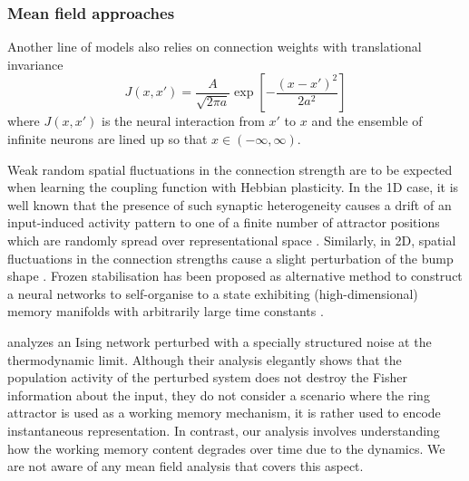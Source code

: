 \documentclass{article} %
\newcounter{ct}
\theoremstyle{definition}
\theoremstyle{remark}
\begin{document}
\subsubsection{Mean field approaches}
Another line of models	\citep{miller2006analysis,wu2008dynamics,fung2010} also relies on connection weights with translational invariance
\begin{equation}
J(x, x') = \frac{A}{\sqrt{2\pi a}} \exp\left[ -\frac{(x - x')^2}{2a^2} \right]
\end{equation}
where \(J (x, x')\) is the neural interaction from \(x'\) to \(x\) and the ensemble of infinite neurons are lined up so that \(x\in (-\infty, \infty)\).

Weak random spatial fluctuations in the connection strength are to be expected when learning the coupling function with Hebbian plasticity.
In the 1D case, it is well known that the presence of such synaptic heterogeneity causes a drift of an input-induced activity pattern to one of a finite number of attractor positions which are randomly spread over representational space \citep{Renart2003,itskov2011short}.
Similarly, in 2D, spatial fluctuations in the connection strengths cause a slight perturbation of the bump shape \citep{wojtak2023robust}.
Frozen stabilisation has been proposed as alternative method to construct a neural networks to self-organise to a state exhibiting (high-dimensional) memory manifolds with arbitrarily large time constants \citep{can2021emergence}. %



\citep{kuhn2023information} analyzes an Ising network perturbed with a specially structured noise at the thermodynamic limit.
Although their analysis elegantly shows that the population activity of the perturbed system does not destroy the Fisher information about the input, they do not consider a scenario where the ring attractor is used as a working memory mechanism, it is rather used to encode instantaneous representation.
In contrast, our analysis involves understanding how the working memory content degrades over time due to the dynamics. We are not aware of any mean field analysis that covers this aspect.




\end{document}
